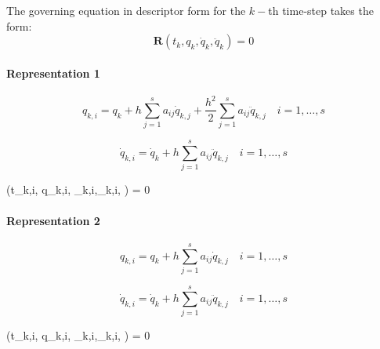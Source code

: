 \documentclass[pdftex,11pt,letter]{article}
\begin{document}
The governing equation in descriptor form for the $k-$th time-step
takes the form:
\begin{equation}
  \mathbf{R}\left(t_{k}, q_{k}, \dot{q}_{k},\ddot{q}_{k}\right) = 0
\end{equation}
%
%


\paragraph{Representation 1}

\begin{equation}\label{stage_implicit1}
  q_{k,i} = q_{k} + h \sum_{j=1}^s a_{ij} \dot{q}_{k,j} + \frac{h^2}{2} \sum_{j=1}^s a_{ij} \ddot{q}_{k,j} \quad i = 1,\ldots,s 
\end{equation}

\begin{equation}\label{stage_implicit2}
  \dot{q}_{k,i} = \dot{q}_{k} + h \sum_{j=1}^s a_{ij} \ddot{q}_{k,j} \quad i = 1,\ldots,s 
\end{equation}


\beq
{}\left(t_{k,i}, q_{k,i}, _{k,i},_{k,i},     \right) = 0
\eeq



\paragraph{Representation 2}

\begin{equation}\label{stage_implicit1}
  q_{k,i} = q_{k} + h \sum_{j=1}^s a_{ij} \dot{q}_{k,j} \quad i = 1,\ldots,s 
\end{equation}

\begin{equation}\label{stage_implicit2}
  \dot{q}_{k,i} = \dot{q}_{k} + h \sum_{j=1}^s a_{ij} \ddot{q}_{k,j} \quad i = 1,\ldots,s 
\end{equation}


\beq
{}\left(t_{k,i}, q_{k,i}, _{k,i},_{k,i},     \right) = 0
\eeq
\end{document}
